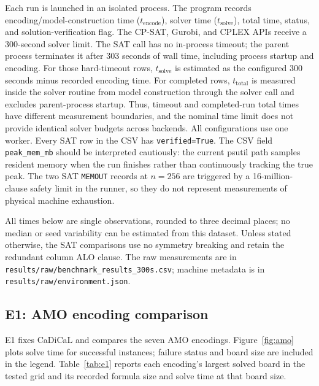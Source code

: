 \documentclass[a4paper,fleqn]{cas-sc}
\begin{document}
Each run is launched in an isolated process. The program records encoding/model-construction time ($t_{\mathrm{encode}}$), solver time ($t_{\mathrm{solve}}$), total time, status, and solution-verification flag. The CP-SAT, Gurobi, and CPLEX APIs receive a 300-second solver limit. The SAT call has no in-process timeout; the parent process terminates it after 303 seconds of wall time, including process startup and encoding. For those hard-timeout rows, $t_{\mathrm{solve}}$ is estimated as the configured 300 seconds minus recorded encoding time. For completed rows, $t_{\mathrm{total}}$ is measured inside the solver routine from model construction through the solver call and excludes parent-process startup. Thus, timeout and completed-run total times have different measurement boundaries, and the nominal time limit does not provide identical solver budgets across backends. All configurations use one worker. Every SAT row in the CSV has \texttt{verified=True}. The CSV field \texttt{peak\_mem\_mb} should be interpreted cautiously: the current psutil path samples resident memory when the run finishes rather than continuously tracking the true peak. The two SAT \texttt{MEMOUT} records at $n=256$ are triggered by a 16-million-clause safety limit in the runner, so they do not represent measurements of physical machine exhaustion.

All times below are single observations, rounded to three decimal places; no median or seed variability can be estimated from this dataset. Unless stated otherwise, the SAT comparisons use no symmetry breaking and retain the redundant column ALO clause. The raw measurements are in \texttt{results/raw/benchmark\_results\_300s.csv}; machine metadata is in \texttt{results/raw/environment.json}.

\FloatBarrier
\subsection{E1: AMO encoding comparison}
E1 fixes CaDiCaL and compares the seven AMO encodings. Figure~\ref{fig:amo} plots solve time for successful instances; failure status and board size are included in the legend. Table~\ref{tab:e1} reports each encoding's largest solved board in the tested grid and its recorded formula size and solve time at that board size.
\end{document}
